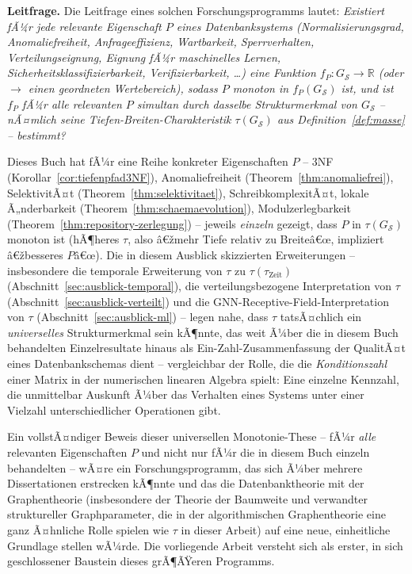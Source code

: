 ﻿\documentclass[a4paper,12pt]{report}
\theoremstyle{definition}
\theoremstyle{remark}
\begin{document}
\textbf{Leitfrage.} Die Leitfrage eines solchen Forschungsprogramms
lautet: \emph{Existiert fÃ¼r jede relevante Eigenschaft $P$ eines
Datenbanksystems (Normalisierungsgrad, Anomaliefreiheit,
Anfrageeffizienz, Wartbarkeit, Sperrverhalten, Verteilungseignung,
Eignung fÃ¼r maschinelles Lernen, Sicherheitsklassifizierbarkeit,
Verifizierbarkeit, \ldots) eine Funktion $f_P: G_{\mathcal{S}} \to
\mathbb{R}$ (oder $\to$ einen geordneten Wertebereich), sodass $P$
\emph{monoton} in $f_P(G_{\mathcal{S}})$ ist, und ist $f_P$ fÃ¼r alle
relevanten $P$ \emph{simultan} durch dasselbe Strukturmerkmal von
$G_{\mathcal{S}}$ -- nÃ¤mlich seine Tiefen-Breiten-Charakteristik
$\tau(G_{\mathcal{S}})$ aus Definition~\ref{def:masse} -- bestimmt?}

Dieses Buch hat fÃ¼r eine Reihe konkreter Eigenschaften $P$ -- 3NF
(Korollar~\ref{cor:tiefenpfad3NF}), Anomaliefreiheit
(Theorem~\ref{thm:anomaliefrei}), SelektivitÃ¤t
(Theorem~\ref{thm:selektivitaet}), SchreibkomplexitÃ¤t, lokale
Ã„nderbarkeit (Theorem~\ref{thm:schaemaevolution}), Modulzerlegbarkeit
(Theorem~\ref{thm:repository-zerlegung}) -- jeweils \emph{einzeln}
gezeigt, dass $P$ in $\tau(G_{\mathcal{S}})$ monoton ist (hÃ¶heres
$\tau$, also â€žmehr Tiefe relativ zu Breiteâ€œ, impliziert â€žbesseres
$P$â€œ). Die in diesem Ausblick skizzierten Erweiterungen --
insbesondere die temporale Erweiterung von $\tau$ zu
$\tau(\tau_{\text{Zeit}})$ (Abschnitt~\ref{sec:ausblick-temporal}),
die verteilungsbezogene Interpretation von $\tau$
(Abschnitt~\ref{sec:ausblick-verteilt}) und die
GNN-Receptive-Field-Interpretation von $\tau$
(Abschnitt~\ref{sec:ausblick-ml}) -- legen nahe, dass $\tau$ tatsÃ¤chlich
ein \emph{universelles} Strukturmerkmal sein kÃ¶nnte, das weit Ã¼ber die
in diesem Buch behandelten Einzelresultate hinaus als
\glqq Ein-Zahl-Zusammenfassung\grqq{} der QualitÃ¤t eines
Datenbankschemas dient -- vergleichbar der Rolle, die die
\emph{Konditionszahl} einer Matrix in der numerischen linearen
Algebra spielt: Eine einzelne Kennzahl, die unmittelbar Auskunft Ã¼ber
das Verhalten eines Systems unter einer Vielzahl unterschiedlicher
Operationen gibt.

Ein vollstÃ¤ndiger Beweis dieser \glqq universellen Monotonie-These\grqq{}
-- fÃ¼r \emph{alle} relevanten Eigenschaften $P$ und nicht nur fÃ¼r die
in diesem Buch einzeln behandelten -- wÃ¤re ein Forschungsprogramm, das
sich Ã¼ber mehrere Dissertationen erstrecken kÃ¶nnte und das die
Datenbanktheorie mit der Graphentheorie (insbesondere der Theorie der
Baumweite und verwandter struktureller Graphparameter, die in der
algorithmischen Graphentheorie eine ganz Ã¤hnliche Rolle spielen wie
$\tau$ in dieser Arbeit) auf eine neue, einheitliche Grundlage stellen
wÃ¼rde. Die vorliegende Arbeit versteht sich als erster, in sich
geschlossener Baustein dieses grÃ¶ÃŸeren Programms.
\end{document}
